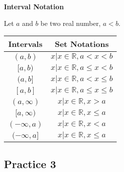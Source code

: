 \documentclass[12pt]{report}
\begin{document}
\begin{mdframed}[style=MyFrame]
  \large{\textbf{Interval Notation}}
  \normalsize

  \noindent Let $a$ and $b$ be two real number, $a < b$.
  \begin{center}
    \begin{tabular}{|c|c|}
      \hline
      Intervals      & Set Notations                             \\
      \hline
      $(a, b)$       & ${x | x \in \mathbb{R}, a < x < b}$       \\
      $[a, b)$       & ${x | x \in \mathbb{R}, a \leq x < b}$    \\
      $(a, b]$       & ${x | x \in \mathbb{R}, a < x \leq b}$    \\
      $[a, b]$       & ${x | x \in \mathbb{R}, a \leq x \leq b}$ \\
      $(a, \infty)$  & ${x | x \in \mathbb{R}, x > a}$           \\
      $[a, \infty)$  & ${x | x \in \mathbb{R}, x \leq a}$        \\
      $(-\infty, a)$ & ${x | x \in \mathbb{R}, x < a}$           \\
      $(-\infty, a]$ & ${x | x \in \mathbb{R}, x \leq a}$        \\
      \hline
    \end{tabular}
  \end{center}
\end{mdframed}

\subsection*{Practice 3}
\end{document}

